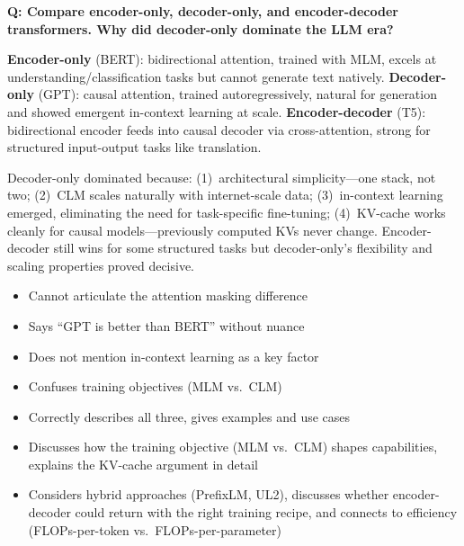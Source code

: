 \bigskip

\begin{interviewq}
\textbf{Q: Compare encoder-only, decoder-only, and encoder-decoder transformers.
Why did decoder-only dominate the LLM era?}

 \quad {} \quad \badgefreq{\freqhigh}

\stronganswer
\textbf{Encoder-only} (BERT): bidirectional attention, trained with MLM, excels
at understanding/classification tasks but cannot generate text natively.
\textbf{Decoder-only} (GPT): causal attention, trained autoregressively,
natural for generation and showed emergent in-context learning at scale.
\textbf{Encoder-decoder} (T5): bidirectional encoder feeds into causal decoder
via cross-attention, strong for structured input-output tasks like translation.

Decoder-only dominated because: (1)~architectural simplicity---one stack, not
two; (2)~CLM scales naturally with internet-scale data; (3)~in-context learning
emerged, eliminating the need for task-specific fine-tuning; (4)~KV-cache
works cleanly for causal models---previously computed KVs never change.
Encoder-decoder still wins for some structured tasks but decoder-only's
flexibility and scaling properties proved decisive.

\redflags
\begin{itemize}
    \item Cannot articulate the attention masking difference
    \item Says ``GPT is better than BERT'' without nuance
    \item Does not mention in-context learning as a key factor
    \item Confuses training objectives (MLM vs.\ CLM)
\end{itemize}


\goodgreat
\begin{itemize}
    \item {} Correctly describes all three, gives examples and use cases
    \item {} Discusses how the training objective (MLM vs.\ CLM) shapes
          capabilities, explains the KV-cache argument in detail
    \item {} Considers hybrid approaches (PrefixLM, UL2), discusses
          whether encoder-decoder could return with the right training recipe, and
          connects to efficiency (FLOPs-per-token vs.\ FLOPs-per-parameter)
\end{itemize}

\end{interviewq}

